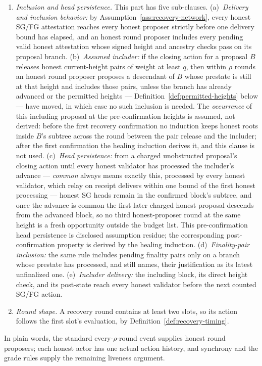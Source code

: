 \begin{assumption}
\begin{enumerate}
\item \emph{Inclusion and head persistence.}  This part has five
   sub-clauses.
   (a)~\emph{Delivery and inclusion behavior:} by
   Assumption~\ref{ass:recovery-network}, every honest SG/FG
   attestation reaches every honest proposer strictly before one
   delivery bound has elapsed, and an honest round proposer includes
   every pending valid honest attestation whose signed height and
   ancestry checks pass on its proposal branch.
   (b)~\emph{Assumed includer:} if the closing action for a proposal
   \(B\) releases honest current-height pairs of weight at least
   \(q\), then within \(\rho\) rounds an honest round proposer
   proposes a descendant of \(B\) whose prestate is still at that
   height and includes those pairs, unless the branch has already
   advanced or the permitted heights ---
   Definition~\ref{def:permitted-heights} below --- have moved, in
   which case no such inclusion is needed.  The \emph{occurrence} of
   this including proposal at the pre-confirmation heights is assumed,
   not derived: before the first recovery confirmation no induction
   keeps honest roots inside \(B\)'s subtree across the round between
   the pair release and the includer; after the first confirmation the
   healing induction derives it, and this clause is not used.
   (c)~\emph{Head persistence:} from a charged unobstructed proposal's
   closing action until every honest validator has processed the
   includer's advance --- \emph{common} always means exactly this,
   processed by every honest validator, which relay on receipt delivers
   within one bound of the first honest processing --- honest SG heads
   remain in the confirmed block's subtree, and once the advance is
   common the first later charged honest proposal descends from the
   advanced block, so no third honest-proposer round at the same height
   is a fresh opportunity outside the budget list.  This
   pre-confirmation head persistence is disclosed assumption residue;
   the corresponding post-confirmation property is derived by the
   healing induction.
   (d)~\emph{Finality-pair inclusion:} the same rule includes pending
   finality pairs only on a branch whose prestate has processed, and
   still names, their justification as its latest unfinalized one.
   (e)~\emph{Includer delivery:} the including block, its direct
   height check, and its post-state reach every honest validator before
   the next counted SG/FG action.

\item \emph{Round shape.}
A recovery round contains at least two slots, so its action follows the
first slot's evaluation, by Definition~\ref{def:recovery-timing}.
\end{enumerate}

In plain words, the standard every-\(\rho\)-round event supplies honest
round proposers; each honest actor has one actual action history, and
synchrony and the grade rules supply the remaining liveness argument.
\end{assumption}




